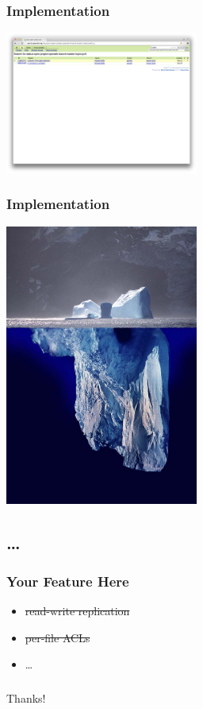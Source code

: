 \documentclass{beamer}
\begin{document}

\begin{frame}
\frametitle{Implementation}
\includegraphics[width=2.5in]{gerrit-ipv6}
\end{frame}

\begin{frame}
\frametitle{Implementation}
\includegraphics[width=2.5in]{iceberg}
\end{frame}

\subsection{\ldots}

\begin{frame}
\frametitle{Your Feature Here}
\begin{itemize}
\item{\sout{read-write replication}}
\item{\sout{per-file ACLs}}
\item{\ldots}
\end{itemize}
\end{frame}

\begin{frame}
\frametitle{}
\Large{Thanks!}
\end{frame}
\end{document}
